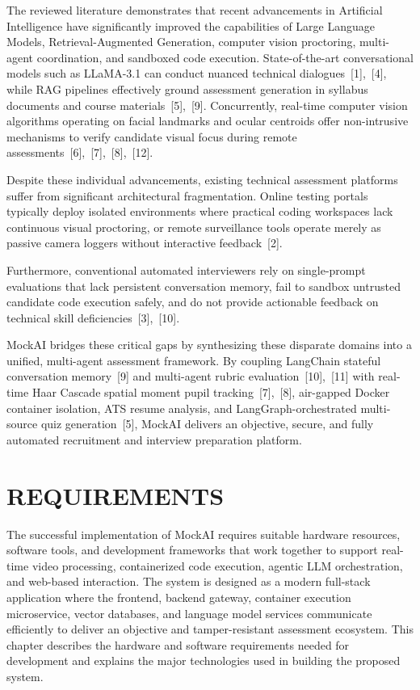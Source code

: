 \documentclass[12pt,a4paper]{report}
\begin{document}
The reviewed literature demonstrates that recent advancements in Artificial Intelligence
have significantly improved the capabilities of Large Language Models, Retrieval-Augmented
Generation, computer vision proctoring, multi-agent coordination, and sandboxed code
execution. State-of-the-art conversational models such as LLaMA-3.1 can conduct nuanced
technical dialogues~[1],~[4], while RAG pipelines effectively ground assessment generation
in syllabus documents and course materials~[5],~[9]. Concurrently, real-time computer
vision algorithms operating on facial landmarks and ocular centroids offer non-intrusive
mechanisms to verify candidate visual focus during remote assessments~[6],~[7],~[8],~[12].

Despite these individual advancements, existing technical assessment platforms suffer from
significant architectural fragmentation. Online testing portals typically deploy isolated
environments where practical coding workspaces lack continuous visual proctoring, or
remote surveillance tools operate merely as passive camera loggers without interactive
feedback~[2].

Furthermore, conventional automated interviewers rely on single-prompt evaluations that
lack persistent conversation memory, fail to sandbox untrusted candidate code execution
safely, and do not provide actionable feedback on technical skill deficiencies~[3],~[10].

MockAI bridges these critical gaps by synthesizing these disparate domains into a unified,
multi-agent assessment framework. By coupling LangChain stateful conversation
memory~[9] and multi-agent rubric evaluation~[10],~[11] with real-time Haar Cascade
spatial moment pupil tracking~[7],~[8], air-gapped Docker container isolation, ATS resume
analysis, and LangGraph-orchestrated multi-source quiz generation~[5], MockAI delivers
an objective, secure, and fully automated recruitment and interview preparation platform.

\chapter{REQUIREMENTS}

The successful implementation of MockAI requires suitable hardware resources, software
tools, and development frameworks that work together to support real-time video
processing, containerized code execution, agentic LLM orchestration, and web-based
interaction. The system is designed as a modern full-stack application where the frontend,
backend gateway, container execution microservice, vector databases, and language model
services communicate efficiently to deliver an objective and tamper-resistant assessment
ecosystem. This chapter describes the hardware and software requirements needed for
development and explains the major technologies used in building the proposed system.
\end{document}
